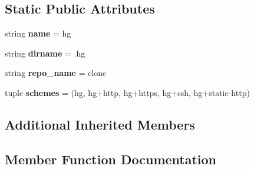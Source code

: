 \subsection*{Static Public Attributes}
\begin{DoxyCompactItemize}
\item 
\mbox{\label{classpip_1_1vcs_1_1mercurial_1_1_mercurial_a7f31541970ba1ae8bc59d2d5a00dff87}} 
string {\bfseries name} = \textquotesingle{}hg\textquotesingle{}
\item 
\mbox{\label{classpip_1_1vcs_1_1mercurial_1_1_mercurial_a7a19e058b9903a19dc85f636a88b3ea0}} 
string {\bfseries dirname} = \textquotesingle{}.hg\textquotesingle{}
\item 
\mbox{\label{classpip_1_1vcs_1_1mercurial_1_1_mercurial_a22404ee003472888be6f32136afa84e0}} 
string {\bfseries repo\+\_\+name} = \textquotesingle{}clone\textquotesingle{}
\item 
\mbox{\label{classpip_1_1vcs_1_1mercurial_1_1_mercurial_ac6ed9fbf5823cc579a6413455f51230a}} 
tuple {\bfseries schemes} = (\textquotesingle{}hg\textquotesingle{}, \textquotesingle{}hg+http\textquotesingle{}, \textquotesingle{}hg+https\textquotesingle{}, \textquotesingle{}hg+ssh\textquotesingle{}, \textquotesingle{}hg+static-\/http\textquotesingle{})
\end{DoxyCompactItemize}
\subsection*{Additional Inherited Members}


\subsection{Member Function Documentation}
\mbox{\label{classpip_1_1vcs_1_1mercurial_1_1_mercurial_ab48bcbc82c1f84cef9e7b9730d6cd3af}} 

